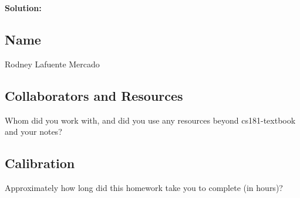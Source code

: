 \documentclass[submit]{harvardml}
\begin{document}
\textbf{Solution:}


\newpage
\newpage
\newpage
\subsection*{Name}
Rodney Lafuente Mercado
\subsection*{Collaborators and Resources}
Whom did you work with, and did you use any resources beyond cs181-textbook and your notes?
\subsection*{Calibration}
Approximately how long did this homework take you to complete (in hours)? 
\end{document}
